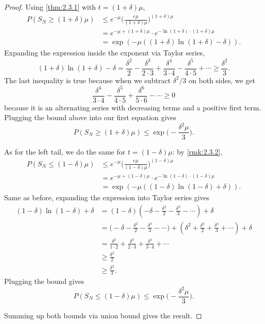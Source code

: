 \begin{proof}
Using \cref{thm:2.3.1} with $t = (1 + \delta)\mu$, 
\begin{align*}
	P(S_N \geq (1 + \delta)\mu)
	&\leq e^{-\mu} \biggl( \frac{e \mu}{(1 + \delta)\mu} \biggr)^{(1 + \delta)\mu} \\
	&= e^{-\mu + (1 + \delta)\mu} \cdot e^{-\ln{(1 + \delta)} \cdot (1 + \delta)\mu} \\
	&= \exp{(-\mu((1 + \delta)\ln{(1 + \delta)} - \delta))}.
\end{align*}
Expanding the expression inside the exponent via Taylor series, 
\[ (1 + \delta)\ln{(1 + \delta)} - \delta = \frac{\delta^2}{2} - \frac{\delta^3}{2 \cdot 3} 
+ \frac{\delta^4}{3 \cdot 4} - \frac{\delta^5}{4 \cdot 5} + \cdots \geq \frac{\delta^2}{3}. \]
The last inequality is true because when we subtract $\delta^2 / 3$ on both sides, we get 
\[ \frac{\delta^4}{3 \cdot 4} - \frac{\delta^5}{4 \cdot 5} + \frac{\delta^6}{5 \cdot 6} - \cdots \geq 0 \]
because it is an alternating series with decreasing terms and a positive first term. Plugging the bound 
above into our first equation gives 
\[ P(S_N \geq (1 + \delta)\mu) \leq \exp{\biggl( -\frac{\delta^2 \mu}{3} \biggr)}. \]

As for the left tail, we do the same for $t = (1 - \delta)\mu$: by \cref{rmk:2.3.2},
\begin{align*}
	P(S_N \leq (1 - \delta)\mu)
	&\leq e^{-\mu} \biggl( \frac{e \mu}{(1 - \delta)\mu} \biggr)^{(1 - \delta)\mu} \\
	&= e^{-\mu + (1 - \delta)\mu} \cdot e^{-\ln{(1 - \delta)} \cdot (1 - \delta)\mu} \\
	&= \exp{(-\mu((1 - \delta)\ln{(1 - \delta)} + \delta))}.
\end{align*}
Same as before, expanding the expression into Taylor series gives 
\begin{align*}
	(1 - \delta)\ln{(1 - \delta)} + \delta 
	&= (1 - \delta)(-\delta - \frac{\delta^2}{2} - \frac{\delta^3}{3} - \cdots) + \delta \\
	&= \biggl( -\delta - \frac{\delta^2}{2} - \frac{\delta^3}{3} - \cdots \biggr) + 
	(\delta^2 + \frac{\delta^3}{2} + \frac{\delta^4}{3} + \cdots) + \delta \\
	&= \frac{\delta^2}{1 \cdot 2} + \frac{\delta^3}{2 \cdot 3} + \frac{\delta^4}{3 \cdot 4} + \cdots \\
	&\geq \frac{\delta^2}{2} \\
	&\geq \frac{\delta^2}{3}.
\end{align*}
Plugging the bound gives 
\[ P(S_N \leq (1 - \delta)\mu) \leq \exp{\biggl( -\frac{\delta^2 \mu}{3} \biggr)}. \]

Summing up both bounds via union bound gives the result.
\end{proof}

